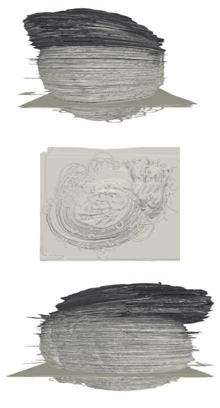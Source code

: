 	\begin{figure}
	  \centering
	  \includegraphics[width=0.9\textheight]{Ch7/Figs/Rat28/contours/whole_positive_y_size}
	  \caption{}
	  \label{fig:image1.png}
	\end{figure}

	\begin{figure}
	  \centering
	  \includegraphics[width=0.9\textheight]{Ch7/Figs/Rat28/contours/whole_positive_z_size}
	  \caption{}
	  \label{fig:image1.png}
	\end{figure}

	\begin{figure}
	  \centering
	  \includegraphics[width=0.9\textheight]{Ch7/Figs/Rat28/contours/whole_positive_x_affine}
	  \caption{}
	  \label{fig:image1.png}
	\end{figure}

